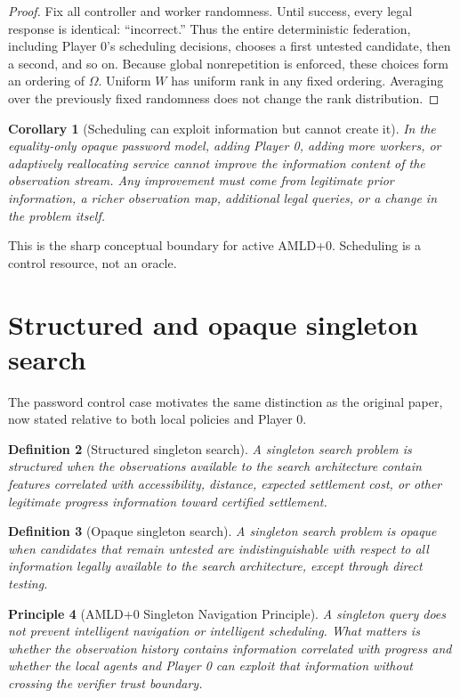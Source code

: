 \documentclass[11pt]{article}
\newtheorem{definition}{Definition}[section]
\newtheorem{principle}[definition]{Principle}
\newtheorem{corollary}[definition]{Corollary}
\begin{document}
\begin{proof}
Fix all controller and worker randomness.  Until success, every legal response
is identical: ``incorrect.''  Thus the entire deterministic federation,
including Player 0's scheduling decisions, chooses a first untested candidate,
then a second, and so on.  Because global nonrepetition is enforced, these
choices form an ordering of $\Omega$.  Uniform $W$ has uniform rank in any fixed
ordering.  Averaging over the previously fixed randomness does not change the
rank distribution.
\end{proof}

\begin{corollary}[Scheduling can exploit information but cannot create it]
In the equality-only opaque password model, adding Player 0, adding more
workers, or adaptively reallocating service cannot improve the information
content of the observation stream.  Any improvement must come from legitimate
prior information, a richer observation map, additional legal queries, or a
change in the problem itself.
\end{corollary}

This is the sharp conceptual boundary for active AMLD+0.  Scheduling is a
control resource, not an oracle.

\section{Structured and opaque singleton search}

The password control case motivates the same distinction as the original
paper, now stated relative to both local policies and Player 0.

\begin{definition}[Structured singleton search]
A singleton search problem is \emph{structured} when the observations
available to the search architecture contain features correlated with
accessibility, distance, expected settlement cost, or other legitimate
progress information toward certified settlement.
\end{definition}

\begin{definition}[Opaque singleton search]
A singleton search problem is \emph{opaque} when candidates that remain
untested are indistinguishable with respect to all information legally
available to the search architecture, except through direct testing.
\end{definition}

\begin{principle}[AMLD+0 Singleton Navigation Principle]
A singleton query does not prevent intelligent navigation or intelligent
scheduling.  What matters is whether the observation history contains
information correlated with progress and whether the local agents and Player 0
can exploit that information without crossing the verifier trust boundary.
\end{principle}
\end{document}
